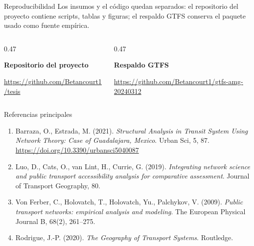 \documentclass[aspectratio=169,10pt]{beamer}
\begin{document}
\begin{frame}{Reproducibilidad}
  Los insumos y el código quedan separados: el repositorio del proyecto contiene scripts, tablas y figuras; el respaldo GTFS conserva el paquete usado como fuente empírica.

  \vspace{0.3cm}
  \begin{columns}[T,onlytextwidth]
    \begin{column}{0.47\linewidth}
      \centering

      \vspace{0.18cm}
      \textbf{Repositorio del proyecto}

      {\scriptsize\url{https://github.com/Betancourt1/tesis}}
    \end{column}
    \begin{column}{0.47\linewidth}
      \centering

      \vspace{0.18cm}
      \textbf{Respaldo GTFS}

      {\scriptsize\url{https://github.com/Betancourt1/gtfs-amg-20240312}}
    \end{column}
  \end{columns}
\end{frame}

\begin{frame}{Referencias principales}
  \scriptsize
  \begin{enumerate}
    \item Barraza, O., Estrada, M. (2021). \textit{Structural Analysis in Transit System Using Network Theory: Case of Guadalajara, Mexico}. Urban Sci, 5, 87. \url{https://doi.org/10.3390/urbansci5040087}

    \item Luo, D., Cats, O., van Lint, H., Currie, G. (2019). \textit{Integrating network science and public transport accessibility analysis for comparative assessment}. Journal of Transport Geography, 80.

    \item Von Ferber, C., Holovatch, T., Holovatch, Yu., Palchykov, V. (2009). \textit{Public transport networks: empirical analysis and modeling}. The European Physical Journal B, 68(2), 261--275.

    \item Rodrigue, J.-P. (2020). \textit{The Geography of Transport Systems}. Routledge.
  \end{enumerate}
\end{frame}
\end{document}

